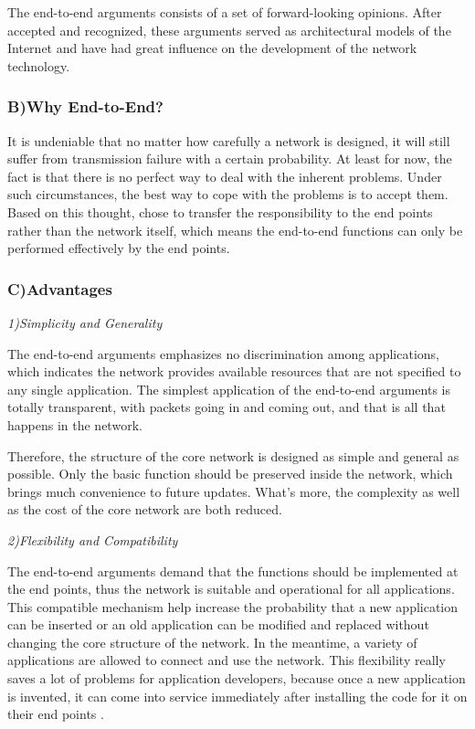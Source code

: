 \documentclass[11pt,twocolumn]{article}
\begin{document}
The end-to-end arguments consists of a set of forward-looking opinions. After accepted and recognized, these arguments served as architectural models of the Internet and have had great influence on the development of the network technology. 

\subsubsection*{B)\quad Why End-to-End?}
It is undeniable that no matter how carefully a network is designed, it will still suffer from transmission failure with a certain probability\cite{ClarkR}. At least for now, the fact is that there is no perfect way to deal with the inherent problems. Under such circumstances, the best way to cope with the problems is to accept them. Based on this thought, \cite{e2e} chose to transfer the responsibility to the end points rather than the network itself, which means the end-to-end functions can only be performed effectively by the end points.

\subsubsection*{C)\quad Advantages}
\emph{1)\quad Simplicity and Generality}

The end-to-end arguments emphasizes no discrimination among applications, which indicates the network provides available resources that are not specified to any single application. The simplest application of the end-to-end arguments is totally transparent, with packets going in and coming out, and that is all that happens in the network. 

Therefore, the structure of the core network is designed as simple and general as possible. Only the basic function should be preserved inside the network, which brings much convenience to future updates. What's more, the complexity as well as the cost of the core network are both reduced.

\emph{2)\quad Flexibility and Compatibility}

The end-to-end arguments demand that the functions should be implemented at the end points, thus the network is suitable and operational for all applications. This compatible mechanism help increase the probability that a new application can be inserted or an old application can be modified and replaced without changing the core structure of the network. In the meantime, a variety of applications are allowed to connect and use the network. This flexibility really saves a lot of problems for application developers, because once a new application is invented, it can come into service immediately after installing the code for it on their end points \cite{Book}.
\end{document}
